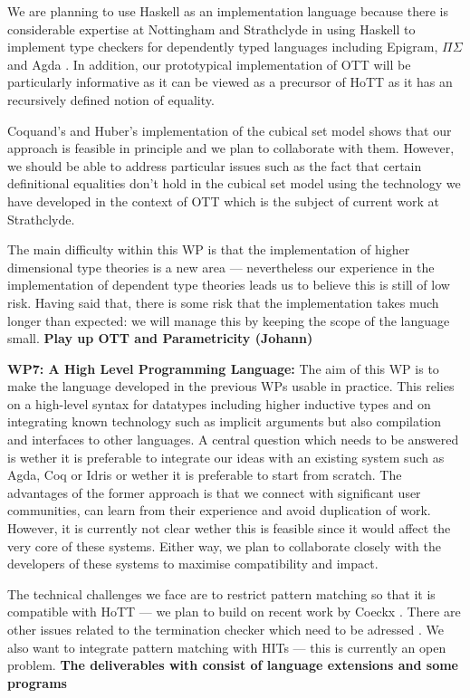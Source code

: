 \documentclass[a4paper,11pt]{article}
\begin{document}
We are planning to use Haskell as an implementation language because
there is considerable expertise at Nottingham and Strathclyde in using
Haskell to implement type checkers for dependently typed languages
including Epigram, $\Pi\Sigma$ and Agda \cite{epigram,easy,pisigma}.
In addition, our prototypical implementation of OTT will be
particularly informative as it can be viewed as a precursor of HoTT as
it has an recursively defined notion of equality. 

Coquand's and Huber's implementation of the cubical set model shows
that our approach is feasible in principle and we plan to collaborate
with them. However, we should be able to address particular issues
such as the fact that certain definitional equalities don't hold in
the cubical set model using the technology we have developed in the
context of OTT \cite{alti:ott-conf} which is the subject of current
work at Strathclyde.

The main difficulty within this WP is that the implementation of
higher dimensional type theories is a new area --- nevertheless our
experience in the implementation of dependent type theories leads us
to believe this is still of low risk. Having said that, there is some
risk that the implementation takes much longer than expected: we will
manage this by keeping the scope of the language small. {\bf Play up OTT and Parametricity (Johann)}

{\bf WP7: A High Level Programming Language:}
The aim of this WP is to make the language developed in the previous
WPs usable in practice. This relies on a high-level syntax for
datatypes including higher inductive types and on integrating known
technology such as implicit arguments but also compilation and
interfaces to other languages. A central question which needs to be
answered is wether it is preferable to integrate our ideas with an
existing system such as Agda, Coq or Idris or wether it is preferable
to start from scratch. The advantages of the former approach is that
we connect with significant user communities, can learn from their
experience and avoid duplication of work. However, it is currently
not clear wether this is feasible since it would affect the very
core of these systems. Either way, we plan to collaborate closely with
the developers of these systems to maximise compatibility and impact.

The technical challenges we face are to restrict pattern matching so
that it is compatible with HoTT --- we plan to build on recent work
by Coeckx \cite{coeckx-without-k}. There are other issues
related to the termination checker which need to be adressed
\cite{coq-agda-issue-w-termination}. We also want to integrate pattern
matching with HITs --- this is currently an open problem. {\bf The
deliverables with consist of language extensions and some programs}
\end{document}
